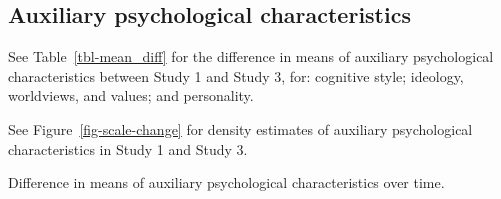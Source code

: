 \documentclass[
  letterpaper,
  DIV=11,
  numbers=noendperiod]{scrartcl}
\begin{document}
\clearpage

\hypertarget{auxiliary-psychological-characteristics}{%
\subsection{Auxiliary psychological
characteristics}\label{auxiliary-psychological-characteristics}}

See Table~\ref{tbl-mean_diff} for the difference in means of auxiliary
psychological characteristics between Study 1 and Study 3, for:
cognitive style; ideology, worldviews, and values; and personality.

See Figure~\ref{fig-scale-change} for density estimates of auxiliary
psychological characteristics in Study 1 and Study 3.

\hypertarget{tbl-mean_diff}{}
\begin{table}
\caption{\label{tbl-mean_diff}Difference in means of auxiliary psychological characteristics over
time. }\tabularnewline


\end{table}
\end{document}
